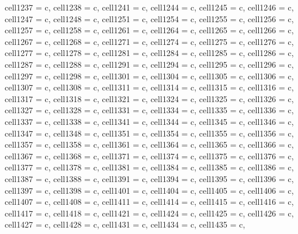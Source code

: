 {\begin{longtblr}[
  label = none,
  entry = none,
]
{  cell{123}{7} = {c},
  cell{123}{8} = {c},
  cell{124}{1} = {c},
  cell{124}{4} = {c},
  cell{124}{5} = {c},
  cell{124}{6} = {c},
  cell{124}{7} = {c},
  cell{124}{8} = {c},
  cell{125}{1} = {c},
  cell{125}{4} = {c},
  cell{125}{5} = {c},
  cell{125}{6} = {c},
  cell{125}{7} = {c},
  cell{125}{8} = {c},
  cell{126}{1} = {c},
  cell{126}{4} = {c},
  cell{126}{5} = {c},
  cell{126}{6} = {c},
  cell{126}{7} = {c},
  cell{126}{8} = {c},
  cell{127}{1} = {c},
  cell{127}{4} = {c},
  cell{127}{5} = {c},
  cell{127}{6} = {c},
  cell{127}{7} = {c},
  cell{127}{8} = {c},
  cell{128}{1} = {c},
  cell{128}{4} = {c},
  cell{128}{5} = {c},
  cell{128}{6} = {c},
  cell{128}{7} = {c},
  cell{128}{8} = {c},
  cell{129}{1} = {c},
  cell{129}{4} = {c},
  cell{129}{5} = {c},
  cell{129}{6} = {c},
  cell{129}{7} = {c},
  cell{129}{8} = {c},
  cell{130}{1} = {c},
  cell{130}{4} = {c},
  cell{130}{5} = {c},
  cell{130}{6} = {c},
  cell{130}{7} = {c},
  cell{130}{8} = {c},
  cell{131}{1} = {c},
  cell{131}{4} = {c},
  cell{131}{5} = {c},
  cell{131}{6} = {c},
  cell{131}{7} = {c},
  cell{131}{8} = {c},
  cell{132}{1} = {c},
  cell{132}{4} = {c},
  cell{132}{5} = {c},
  cell{132}{6} = {c},
  cell{132}{7} = {c},
  cell{132}{8} = {c},
  cell{133}{1} = {c},
  cell{133}{4} = {c},
  cell{133}{5} = {c},
  cell{133}{6} = {c},
  cell{133}{7} = {c},
  cell{133}{8} = {c},
  cell{134}{1} = {c},
  cell{134}{4} = {c},
  cell{134}{5} = {c},
  cell{134}{6} = {c},
  cell{134}{7} = {c},
  cell{134}{8} = {c},
  cell{135}{1} = {c},
  cell{135}{4} = {c},
  cell{135}{5} = {c},
  cell{135}{6} = {c},
  cell{135}{7} = {c},
  cell{135}{8} = {c},
  cell{136}{1} = {c},
  cell{136}{4} = {c},
  cell{136}{5} = {c},
  cell{136}{6} = {c},
  cell{136}{7} = {c},
  cell{136}{8} = {c},
  cell{137}{1} = {c},
  cell{137}{4} = {c},
  cell{137}{5} = {c},
  cell{137}{6} = {c},
  cell{137}{7} = {c},
  cell{137}{8} = {c},
  cell{138}{1} = {c},
  cell{138}{4} = {c},
  cell{138}{5} = {c},
  cell{138}{6} = {c},
  cell{138}{7} = {c},
  cell{138}{8} = {c},
  cell{139}{1} = {c},
  cell{139}{4} = {c},
  cell{139}{5} = {c},
  cell{139}{6} = {c},
  cell{139}{7} = {c},
  cell{139}{8} = {c},
  cell{140}{1} = {c},
  cell{140}{4} = {c},
  cell{140}{5} = {c},
  cell{140}{6} = {c},
  cell{140}{7} = {c},
  cell{140}{8} = {c},
  cell{141}{1} = {c},
  cell{141}{4} = {c},
  cell{141}{5} = {c},
  cell{141}{6} = {c},
  cell{141}{7} = {c},
  cell{141}{8} = {c},
  cell{142}{1} = {c},
  cell{142}{4} = {c},
  cell{142}{5} = {c},
  cell{142}{6} = {c},
  cell{142}{7} = {c},
  cell{142}{8} = {c},
  cell{143}{1} = {c},
  cell{143}{4} = {c},
  cell{143}{5} = {c},
}
\end{longtblr}}
